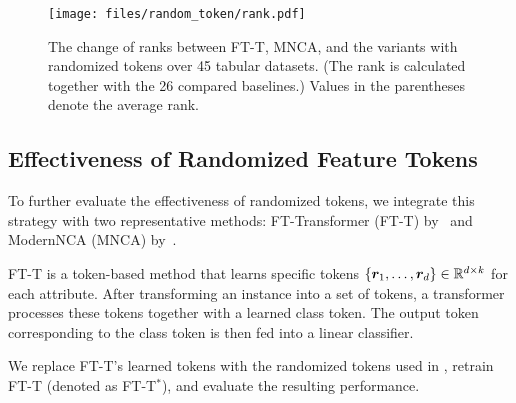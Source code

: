 \begin{figure}[t]
    \centering
            \vspace{-1mm}
    \texttt{[image: files/random\_token/rank.pdf]}
        \vspace{-8mm}
    \caption{The change of ranks between FT-T, MNCA, and the variants with randomized tokens over 45 tabular datasets. (The rank is calculated together with the 26 compared baselines.)
    Values in the parentheses denote the average rank.
    }
    \vspace{-1mm}
    \label{fig:random_token}
\end{figure}

\subsection{Effectiveness of Randomized Feature Tokens}
To further evaluate the effectiveness of randomized tokens, we integrate this strategy with two representative methods: FT-Transformer (FT-T) by~\citet{GorishniyRKB21Revisiting} and ModernNCA (MNCA) by~\citet{Ye2024ModernNCA}.

FT-T is a token-based method that learns specific tokens $\{{\bm{r}}_1, \ldots, {\bm{r}}_d\} \in {\mathbb{R}}^{d \times k}$ for each attribute. After transforming an instance into a set of tokens, a transformer processes these tokens together with a learned class token. The output token corresponding to the class token is then fed into a linear classifier. 

We replace FT-T's learned tokens with the randomized tokens used in \ours, retrain FT-T (denoted as FT-T$^*$), and evaluate the resulting performance.

